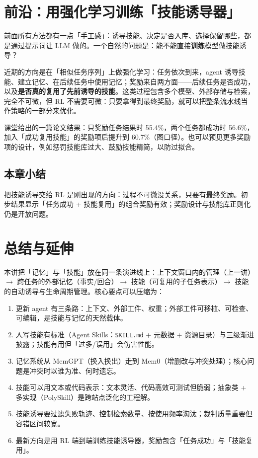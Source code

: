 ﻿\documentclass[a4paper]{article}
\begin{document}
\section{前沿：用强化学习训练「技能诱导器」}

前面所有方法都有一点「手工感」：诱导技能、决定是否入库、选择保留哪些，都是通过提示词让 LLM 做的。一个自然的问题是：能不能直接\textbf{训练}模型做技能诱导？

近期的方向是在「相似任务序列」上做强化学习：任务依次到来，agent 诱导技能、建立记忆、在后续任务中使用记忆；奖励来自两方面——后续任务是否成功，以及\textbf{是否真的复用了先前诱导的技能}。这类过程包含多个模型、外部存储与检索，完全不可微，但 RL 不需要可微：只要拿得到最终奖励，就可以把整条流水线当作策略的一部分来优化。

课堂给出的一篇论文结果：只奖励任务结果时 55.4\%，两个任务都成功时 56.6\%，加入「成功复用技能」的奖励项后提升到 60.7\%（图口径）。也可以预见更多奖励项的设计，例如惩罚技能库过大、鼓励技能精简，以防过拟合。

\subsection{本章小结}
把技能诱导交给 RL 是刚出现的方向：过程不可微没关系，只要有最终奖励。初步结果显示「任务成功 + 技能复用」的组合奖励有效；奖励设计与技能库正则化仍是开放问题。

\section{总结与延伸}

本讲把「记忆」与「技能」放在同一条演进线上：上下文窗口内的管理（上一讲）$\rightarrow$ 跨任务的外部记忆（事实/回合）$\rightarrow$ 技能（可复用的子任务表示）$\rightarrow$ 技能的自动诱导与生命周期管理。核心要点可以压缩为：

\begin{enumerate}
\item 更新 agent 有三条路：上下文、外部工件、权重；外部工件可移植、可检查、可编辑，是技能与记忆的天然载体。
\item 人写技能有标准（Agent Skills：\texttt{SKILL.md} + 元数据 + 资源目录）与三级渐进披露；技能有用但「过多/误用」会伤害性能。
\item 记忆系统从 MemGPT（换入换出）走到 Mem0（增删改与冲突处理）；核心问题是冲突时以谁为准、何时遗忘。
\item 技能可以用文本或代码表示：文本灵活、代码高效可测试但脆弱；抽象类 + 多实现（PolySkill）是跨站点泛化的工程解。
\item 技能诱导要过滤失败轨迹、控制检索数量、按使用频率淘汰；裁判质量重要但容错区间较宽。
\item 最新方向是用 RL 端到端训练技能诱导器，奖励包含「任务成功」与「技能复用」。
\end{enumerate}
\end{document}
